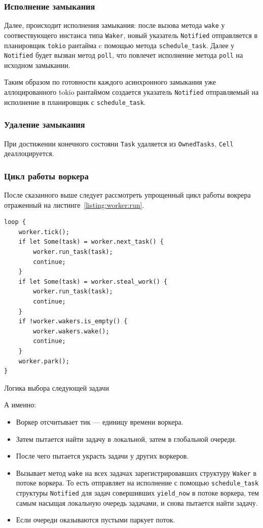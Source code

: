 \subsubsection{Исполнение замыкания}

Далее, происходит исполнения замыкания: после вызова метода \verb|wake| у соотвествующего инстанса типа \verb|Waker|, новый указатель \verb|Notified| отправляется в планировщик \verb|tokio| рантайма c помощью метода \verb|schedule_task|. Далее у \verb|Notified| будет вызван метод \verb|poll|, что повлечет исполнение метода \verb|poll| на исходном замыкании.

Таким образом по готовности каждого асинхронного замыкания уже аллоцированного tokio рантаймом создается указатель \verb|Notified| отправляемый на исполнение в планировщик с \verb|schedule_task|.

\subsubsection{Удаление замыкания}

При достижении конечного состояни \verb|Task| удаляется из \verb|OwnedTasks|, \verb|Cell| деаллоцируется.

\subsubsection{Цикл работы воркера}

После сказанного выше следует рассмотреть упрощенный цикл работы вокрера отраженный на листинге~\ref{listing:worker:run}.

\begin{listing}[H]
    \begin{verbatim}
loop {
    worker.tick();
    if let Some(task) = worker.next_task() {
        worker.run_task(task);
        continue;
    }
    if let Some(task) = worker.steal_work() {
        worker.run_task(task);
        continue;
    }
    if !worker.wakers.is_empty() {
        worker.wakers.wake();
        continue;
    }
    worker.park();
}
    \end{verbatim}

    \caption{Логика выбора следующей задачи}
    \label{listing:worker:run}
\end{listing}

А именно:

\begin{itemize}
    \item Воркер отсчитывает тик --- единицу времени воркера.
    \item Затем пытается найти задачу в локальной, затем в глобальной очереди.
    \item После чего пытается украсть задачи у других воркеров.
    \item Вызывает метод \verb|wake| на всех задачах зарегистрировавших структуру \verb|Waker| в потоке воркера. То есть отправляет на исполнение с помощью \verb|schedule_task| структуры \verb|Notified| для задач совершивших \verb|yield_now| в потоке воркера, тем самым насыщая локальную очередь задачами, и снова пытается найти задачу.
    \item Если очереди оказываются пустыми паркует поток.
\end{itemize}

